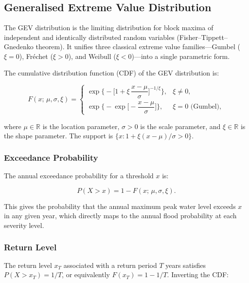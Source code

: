 \documentclass[11pt,a4paper]{article}
\begin{document}
\clearpage

\mkmframework

\subsection{Generalised Extreme Value Distribution}

The GEV distribution is the limiting distribution for block maxima of independent and identically distributed random variables (Fisher--Tippett--Gnedenko theorem). It unifies three classical extreme value families---Gumbel ($\xi = 0$), Fr\'{e}chet ($\xi > 0$), and Weibull ($\xi < 0$)---into a single parametric form.

The cumulative distribution function (CDF) of the GEV distribution is:

\[
F(x;\,\mu,\sigma,\xi) =
\begin{cases}
\exp\!\Bigg\{-\Bigg[1 + \xi\,\dfrac{x - \mu}{\sigma}\Bigg]^{-1/\xi}\Bigg\}, & \xi \neq 0, \\[12pt]
\exp\!\Bigg\{-\exp\!\Bigg[-\dfrac{x - \mu}{\sigma}\Bigg]\Bigg\}, & \xi = 0 \text{ (Gumbel)},
\end{cases}
\]

\noindent where $\mu \in \mathbb{R}$ is the location parameter, $\sigma > 0$ is the scale parameter, and $\xi \in \mathbb{R}$ is the shape parameter. The support is $\{x : 1 + \xi(x - \mu)/\sigma > 0\}$.

\subsubsection{Exceedance Probability}

The annual exceedance probability for a threshold $x$ is:

\[
P(X > x) = 1 - F(x;\,\mu,\sigma,\xi).
\]

\noindent This gives the probability that the annual maximum peak water level exceeds $x$ in any given year, which directly maps to the annual flood probability at each severity level.

\subsubsection{Return Level}

The return level $x_T$ associated with a return period $T$ years satisfies $P(X > x_T) = 1/T$, or equivalently $F(x_T) = 1 - 1/T$. Inverting the CDF:
\end{document}
